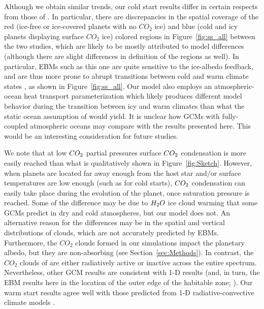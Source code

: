 \documentclass[fleqn,usenatbib]{mnras}
\begin{document}
Although we obtain similar trends, our cold start results differ in certain respects from those of \citet{Turbet2017}. In particular, there are discrepancies in the spatial coverage of the red (ice-free or ice-covered planets with no $CO_{\mathrm{2}}$ ice) and blue (cold and icy planets displaying surface $CO_{\mathrm{2}}$ ice) colored regions in Figure~\ref{fig:ss_all} between the two studies, which are likely to be mostly attributed to model differences (although there are slight differences in definition of the regions as well). In particular, EBMs such as this one are quite sensitive to the ice-albedo feedback, and are thus more prone to abrupt transitions between cold and warm climate states \citep{RamirezLevi2018}, as shown in Figure~\ref{fig:ss_all}. Our model also employs an atmospheric-ocean heat transport parameterization which likely produces different model behavior during the transition between icy and warm climates than what the static ocean assumption of \citet{Turbet2017} would yield. It is unclear how GCMs with fully-coupled atmospheric oceans may compare with the results presented here. This would be an interesting consideration for future studies. 

We note that at low $CO_{\rm 2}$ partial pressures surface $CO_{\rm 2}$ condensation is more easily reached than what is qualitatively shown in Figure~\ref{fig:Sketch}. However, when planets are located far away enough from the host star and/or surface temperatures are low enough (such as for cold starts), $CO_{\rm 2}$ condensation can easily take place during the evolution of the planet, once saturation pressure is reached. Some of the difference may be due to $H_{\rm 2}O$ ice cloud warming that some GCMs predict in dry and cold atmospheres, but our model does not. An alternative reason for the differences may be in the spatial and vertical distributions of clouds, which are not accurately predicted by EBMs. Furthermore, the $CO_{\mathrm{2}}$ clouds formed in our simulations impact the planetary albedo, but they are non-absorbing (see Section~\ref{sec:Methods}). In contrast, the $CO_{\mathrm{2}}$ clouds of \citet{Turbet2017} are either radiatively active or inactive across the entire spectrum. Nevertheless, other GCM results are consistent with 1-D results (and, in turn, the EBM results here in the location of the outer edge of the habitable zone; \citet{wolf2018erratum}). Our warm start results agree well with those predicted from 1-D radiative-convective climate models \citep{kasting1993, KumarKopparapu2013, Ramirez2018}.
\end{document}
